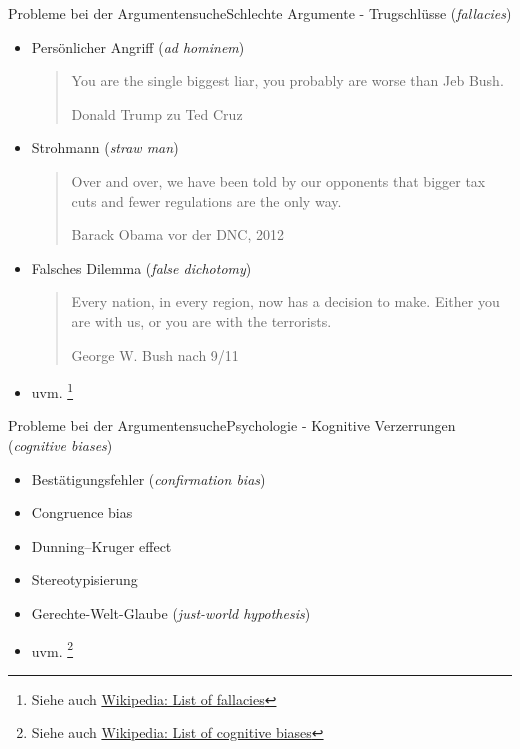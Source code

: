 \documentclass{beamer}
\begin{document}
	\begin{frame}{Probleme bei der Argumentensuche}{Schlechte Argumente - Trugschlüsse (\textit{fallacies})}
		\begin{itemize}[<+->]
			\item Persönlicher Angriff (\textit{ad hominem})
			\begin{quote}
				\small You are the single biggest liar, you probably are worse than Jeb Bush.
				\begin{flushright}
					\tiny Donald Trump zu Ted Cruz
				\end{flushright}
			\end{quote}
			\item Strohmann (\textit{straw man})
			\begin{quote}{}
				\small Over and over, we have been told by our opponents that bigger tax cuts and fewer regulations are the only way.
				\begin{flushright}
					\tiny Barack Obama vor der DNC, 2012
				\end{flushright}
			\end{quote}
			\item Falsches Dilemma (\textit{false dichotomy})
			\begin{quote}{}
				\small Every nation, in every region, now has a decision to make. Either you are with us, or you are with the terrorists.
				\begin{flushright}
					\tiny George W. Bush nach 9/11
				\end{flushright}
			\end{quote}
			\item uvm. \footnote{Siehe auch \href{https://en.wikipedia.org/wiki/List_of_fallacies}{Wikipedia: List of fallacies}}
		\end{itemize}
	\end{frame}

	\begin{frame}{Probleme bei der Argumentensuche}{Psychologie - Kognitive Verzerrungen (\textit{cognitive biases})}
		\begin{itemize}
			\item Bestätigungsfehler (\textit{confirmation bias})
			\item Congruence bias
			\item Dunning–Kruger effect
			\item Stereotypisierung
			\item Gerechte-Welt-Glaube (\textit{just-world hypothesis})
			\item uvm. \footnote{Siehe auch \href{https://en.wikipedia.org/wiki/List_of_cognitive_biases}{Wikipedia: List of cognitive biases}}
		\end{itemize}
	\end{frame}
\end{document}
